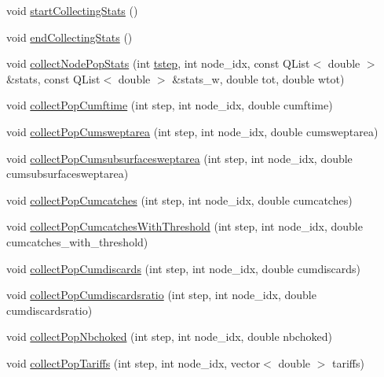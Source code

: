 \begin{DoxyCompactItemize}
\item 
void \mbox{\hyperlink{class_displace_model_ac650e60252b5a661c04426222c289339}{start\+Collecting\+Stats}} ()
\item 
void \mbox{\hyperlink{class_displace_model_a8e1d14587422bad1e03b1488b816ba34}{end\+Collecting\+Stats}} ()
\item 
void \mbox{\hyperlink{class_displace_model_ac78a0131ef9714989eb2cdc4ebe163a2}{collect\+Node\+Pop\+Stats}} (int \mbox{\hyperlink{thread__vessels_8cpp_a84bc73d278de929ec9974e1a95d9b23a}{tstep}}, int node\+\_\+idx, const Q\+List$<$ double $>$ \&stats, const Q\+List$<$ double $>$ \&stats\+\_\+w, double tot, double wtot)
\item 
void \mbox{\hyperlink{class_displace_model_a305ddccded170343a3fde08dbf6e5883}{collect\+Pop\+Cumftime}} (int step, int node\+\_\+idx, double cumftime)
\item 
void \mbox{\hyperlink{class_displace_model_a3440b42da4f1ac019a323822efbf974b}{collect\+Pop\+Cumsweptarea}} (int step, int node\+\_\+idx, double cumsweptarea)
\item 
void \mbox{\hyperlink{class_displace_model_a8e2316a942cb82ba2b17542c9a18c34e}{collect\+Pop\+Cumsubsurfacesweptarea}} (int step, int node\+\_\+idx, double cumsubsurfacesweptarea)
\item 
void \mbox{\hyperlink{class_displace_model_acfc2e5cfe114d565fe114717c4c252d6}{collect\+Pop\+Cumcatches}} (int step, int node\+\_\+idx, double cumcatches)
\item 
void \mbox{\hyperlink{class_displace_model_ae1d8a320144b5ce4a77917b710480892}{collect\+Pop\+Cumcatches\+With\+Threshold}} (int step, int node\+\_\+idx, double cumcatches\+\_\+with\+\_\+threshold)
\item 
void \mbox{\hyperlink{class_displace_model_a1314535dd4affc28cafad84148883098}{collect\+Pop\+Cumdiscards}} (int step, int node\+\_\+idx, double cumdiscards)
\item 
void \mbox{\hyperlink{class_displace_model_a9fd70426f04a4937e26e8de7f443e098}{collect\+Pop\+Cumdiscardsratio}} (int step, int node\+\_\+idx, double cumdiscardsratio)
\item 
void \mbox{\hyperlink{class_displace_model_a89a48eda7c02b492f4ea6abca370a050}{collect\+Pop\+Nbchoked}} (int step, int node\+\_\+idx, double nbchoked)
\item 
void \mbox{\hyperlink{class_displace_model_afb45bf9e8f5f3cc2f8f25c91d9a0366e}{collect\+Pop\+Tariffs}} (int step, int node\+\_\+idx, vector$<$ double $>$ tariffs)
\item 

\end{DoxyCompactItemize}
